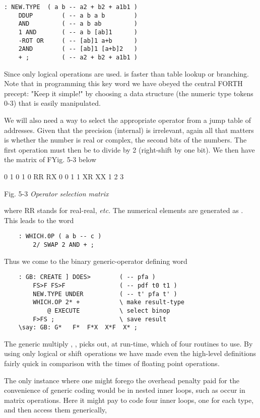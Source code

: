 \begin{lstlisting}
: NEW.TYPE  ( a b -- a2 + b2 + a1b1 )
    DDUP        ( -- a b a b        )
    AND         ( -- a b ab         )
    1 AND       ( -- a b [ab]1      )
    -ROT OR     ( -- [ab]1 a+b      )
    2AND        ( -- [ab]1 [a+b]2   )
    + ;         ( -- a2 + b2 + a1b1 )
\end{lstlisting}

Since only logical operations are used.  is faster than table lookup or branching. Note that in programming this key word we have obeyed the central FORTH precept: "Keep it simple!" by choosing a data structure (the numeric type tokens 0-3) that is easily manipulated.

We will also need a way to select the appropriate operator from a jump table of addresses. Given that the precision (internal) is irrelevant, again all that matters is whether the number is real or complex, \ie the second bits of the numbers. The first operation must then be to divide by 2 (right-shift by one bit). We then have the matrix of FYig. 5-3 below

  0  1        0 1
0 RR RX     0 0 1
1 XR XX     1 2 3

Fig. 5-3 \textit{Operator selection matrix}

where RR stands for real-real, \textit{etc.} The numerical elements are generated as . This leads to the word

\begin{lstlisting}
    : WHICH.0P ( a b -- c )
        2/ SWAP 2 AND + ;
\end{lstlisting}

Thus we come to the binary generic-operator defining word
\begin{lstlisting}
    : GB: CREATE ] DOES>        ( -- pfa )
        FS>F FS>F               ( -- pdf t0 t1 )
        NEW.TYPE UNDER          ( -- t' pfa t' )
        WHICH.OP 2* +           \ make result-type
            @ EXECUTE           \ select binop
        F>FS ;                  \ save result
    \say: GB: G*   F*  F*X  X*F  X* ;
\end{lstlisting}

The generic multiply , \eg, picks out, at run-time, which of four routines to use. By using only logical or shift operations we have made even the high-level definitions fairly quick in comparison with the times of floating point operations.

The only instance where one might forego the overhead penalty paid for the convenience of generic coding would be in nested inner loops, such as occur in matrix operations. Here it might pay to code four inner loops, one for each type, and then access them generically, \eg

